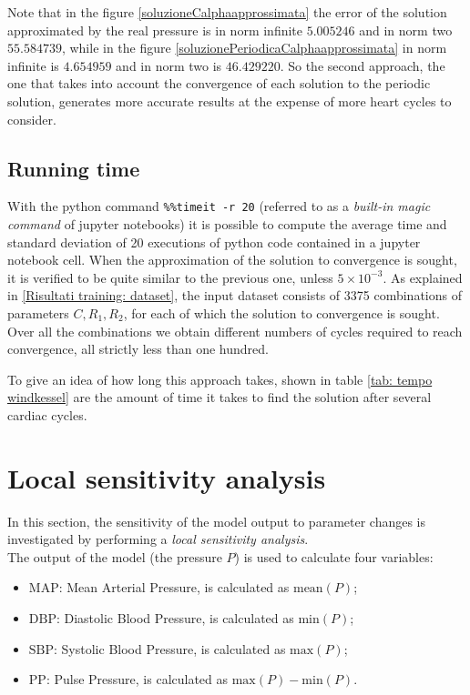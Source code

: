 Note that in the figure \ref{soluzioneCalphaapprossimata} the error of the solution approximated by the real pressure is in norm infinite $5.005246$ and in norm two $55.584739$, while in the figure \ref{soluzionePeriodicaCalphaapprossimata} in norm infinite is $4.654959$ and in norm two is $46.429220$. So the second approach, the one that takes into account the convergence of each solution to the periodic solution, generates more accurate results at the expense of more heart cycles to consider.


\subsection{Running time} \label{Windkessel: tempo esecuzione}
With the python command \verb+%%timeit -r 20+ (referred to as a \textit{built-in magic command} of jupyter notebooks) it is possible to compute the average time and standard deviation of 20 executions of python code contained in a jupyter notebook cell. When the approximation of the solution to convergence is sought, it is verified to be quite similar to the previous one, unless $5\times 10^{-3}$. As explained in \ref{Risultati training: dataset}, the input dataset consists of 3375 combinations of parameters $C, R_1, R_2$, for each of which the solution to convergence is sought. Over all the combinations we obtain different numbers of cycles required to reach convergence, all strictly less than one hundred. 

\newpage

To give an idea of how long this approach takes, shown in table \ref{tab: tempo windkessel} are the amount of time it takes to find the solution after several cardiac cycles.

\vspace{1cm}






\section{Local sensitivity analysis}\label{sensitività}
In this section, the sensitivity of the model output to parameter changes is investigated by performing a \textit{local sensitivity analysis}. \\
The output of the model (the pressure $P$) is used to calculate four variables:
\begin{itemize}
  \item $\text{MAP}$: Mean Arterial Pressure, is calculated as $\text{mean}(P)$;
  \item $\text{DBP}$: Diastolic Blood Pressure, is calculated as $\text{min}(P)$;
  \item $\text{SBP}$: Systolic Blood Pressure,  is calculated as $\text{max}(P)$;
  \item $\text{PP}$: Pulse Pressure, is calculated as $\text{max}(P)-\text{min}(P)$.
\end{itemize}

